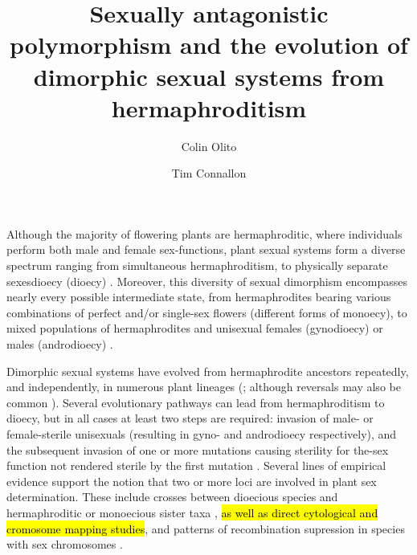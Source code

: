 \documentclass[9pt,twocolumn,twoside,lineno]{gsajnl}
\title{Sexually antagonistic polymorphism and the evolution of dimorphic sexual systems from hermaphroditism}
\author[$\ast$,1]{Colin Olito}
\author[$\ast$]{Tim Connallon}
\affil[$\ast$]{Department of Biological Sciences, Monash University, Melbourne, VIC 3800, Australia}
\begin{document}
\maketitle
\thispagestyle{firststyle}
\marginmark
\firstpagefootnote
{}
\vspace{-11pt}%

\lettrine[lines=2]{\color{color2}A}{}lthough the majority of flowering plants are hermaphroditic, where individuals perform both male and female sex-functions, plant sexual systems form a diverse spectrum ranging from simultaneous hermaphroditism, to physically separate sexesdioecy (dioecy) \citep{Darwin1877,Westergaard1958,Bachtrog2014}. Moreover, this diversity of sexual dimorphism encompasses nearly every possible intermediate state, from hermaphrodites bearing various combinations of perfect and/or single-sex flowers (different forms of monoecy), to mixed populations of hermaphrodites and unisexual females (gynodioecy) or males (androdioecy) \citep{Bawa1980,SakaiWeller1999}.

Dimorphic sexual systems have evolved from hermaphrodite ancestors repeatedly, and independently, in numerous plant lineages (\citealt{Westergaard1958,SakaiWeller1999,Charlesworth2006,Bachtrog2014,Renner2014}; although reversals may also be common \citealt{GoldbergOtto2017,KaferPannell2017}). Several evolutionary pathways can lead from hermaphroditism to dioecy, but in all cases at least two steps are required: invasion of male- or female-sterile unisexuals (resulting in gyno- and androdioecy respectively), and the subsequent invasion of one or more mutations causing sterility for the-sex function not rendered sterile by the first mutation \citep{Westergaard1958,Charlesworth1978a,Charlesworth1978b,Charlesworth2006,Charlesworth2009,KaferPannell2017}. Several lines of empirical evidence support the notion that two or more loci are involved in plant sex determination. These include crosses between dioecious species and hermaphroditic or monoecious sister taxa \citep{Westergaard1958}, \hl{as well as direct cytological and cromosome mapping studies}, and patterns of recombination supression in species with sex chromosomes \citep{Charlesworth2002,Charlesworth2006,Renner2014,Ashman2015}.
\end{document}
